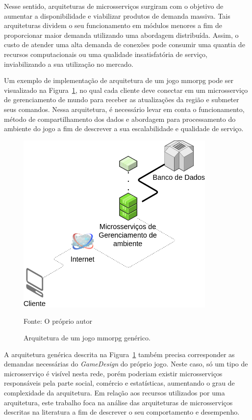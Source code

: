 Nesse sentido, arquiteturas de microsserviços surgiram com o objetivo de aumentar a disponibilidade e viabilizar produtos de demanda massiva.
%
Tais arquiteturas dividem o seu funcionamento em módulos menores a fim de proporcionar maior demanda utilizando uma abordagem distribuída.
%
Assim, o custo de atender uma alta demanda de conexões pode consumir uma quantia de recursos computacionais ou uma qualidade insatisfatória de serviço, inviabilizando a sua utilização no mercado.



Um exemplo de implementação de arquitetura de um jogo \ac{mmorpg} pode ser visualizado na Figura~\ref{fig:generica}, no qual cada cliente deve conectar em um microsserviço de gerenciamento de mundo para receber as atualizações da região e submeter seus comandos.
%
Nessa arquitetura, é necessário levar em conta o funcionamento, método de compartilhamento dos dados e abordagem para processamento do ambiente do jogo a fim de descrever a sua escalabilidade e qualidade de serviço.


\begin{figure}[htb!]
\caption{Arquitetura de um jogo \ac{mmorpg} genérico.}
\label{fig:generica}
\includegraphics[height=9.0cm]{img/cap3/generica.png}
\centering

Fonte: O próprio autor
\end{figure}

A arquitetura genérica descrita na Figura~\ref{fig:generica} também precisa corresponder as demandas necessárias do \textit{GameDesign} do próprio jogo.
%
Neste caso, só um tipo de microsserviço é visível nesta rede, porém poderiam existir microsserviços responsáveis pela parte social, comércio e estatísticas, aumentando o grau de complexidade da arquitetura.
%
Em relação aos recursos utilizados por uma arquitetura, este trabalho foca na análise das arquiteturas de microsserviços descritas na literatura a fim de descrever o seu comportamento e desempenho.



